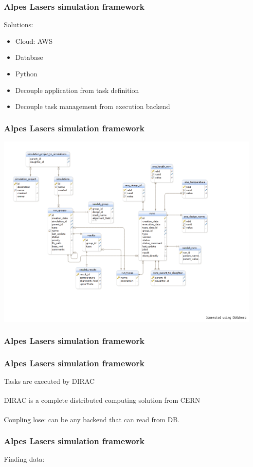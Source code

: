 \documentclass[14pt,notes]{beamer}
\begin{document}
\begin{frame}
\frametitle{Alpes Lasers simulation framework}
Solutions:
\begin{itemize}
\item Cloud: AWS
\item Database
\item Python
\item Decouple application from task definition
\item Decouple task management from execution backend
\end{itemize}
\end{frame}

\begin{frame}
\frametitle{Alpes Lasers simulation framework}
\includegraphics[width=1.3\textwidth]{simudb}
\end{frame}

\begin{frame}
\frametitle{Alpes Lasers simulation framework}

\end{frame}

\begin{frame}
\frametitle{Alpes Lasers simulation framework}
Tasks are executed by DIRAC\\
~\\
DIRAC is a complete distributed computing solution from CERN\\
~\\
Coupling lose: can be any backend that can read from DB.
\end{frame}

\begin{frame}
\frametitle{Alpes Lasers simulation framework}
Finding data:

\end{frame}
\end{document}
